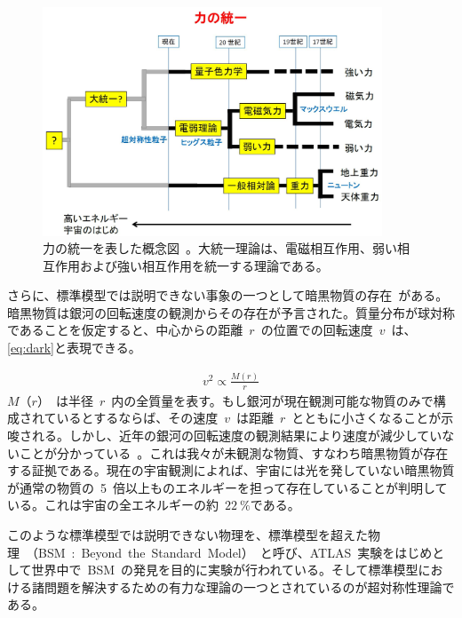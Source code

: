 \begin{figure}[tb]
        \centering   
        \includegraphics[width=0.9\textwidth]{img/jpeg/physics_bsm_05.jpg}
        \caption[力の統一を表した概念図]{力の統一を表した概念図~\cite{URL:01}。大統一理論は、電磁相互作用、弱い相互作用および強い相互作用を統一する理論である。}\label{fig:gut}
\end{figure}


さらに、標準模型では説明できない事象の一つとして暗黒物質の存在~\cite{AR:11}がある。暗黒物質は銀河の回転速度の観測からその存在が予言された。質量分布が球対称であることを仮定すると、中心からの距離~$r$~の位置での回転速度~$v$~は、\eqref{eq:dark}と表現できる。

\begin{align}
    v^2\propto\frac{M(r)}{r} \label{eq:dark}
\end{align}
$M（r）$~は半径~$r$~内の全質量を表す。もし銀河が現在観測可能な物質のみで構成されているとするならば、その速度~$v$~は距離~$r$~とともに小さくなることが示唆される。しかし、近年の銀河の回転速度の観測結果により速度が減少していないことが分かっている~\cite{AR:16}。これは我々が未観測な物質、すなわち暗黒物質が存在する証拠である。現在の宇宙観測によれば、宇宙には光を発していない暗黒物質が通常の物質の~5~倍以上ものエネルギーを担って存在していることが判明している。これは宇宙の全エネルギーの約~$22~\%$である。

このような標準模型では説明できない物理を、標準模型を超えた物理~（BSM~:~Beyond~the~Standard~Model）~と呼び、ATLAS~実験をはじめとして世界中で~BSM~の発見を目的に実験が行われている。そして標準模型における諸問題を解決するための有力な理論の一つとされているのが超対称性理論である。

